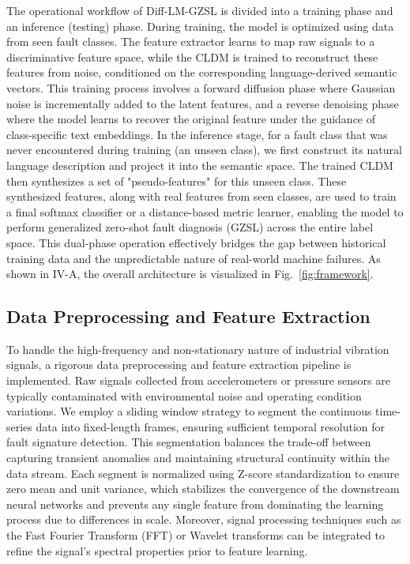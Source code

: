The operational workflow of Diff-LM-GZSL is divided into a training phase and an inference (testing) phase. During training, the model is optimized using data from seen fault classes. The feature extractor learns to map raw signals to a discriminative feature space, while the CLDM is trained to reconstruct these features from noise, conditioned on the corresponding language-derived semantic vectors. This training process involves a forward diffusion phase where Gaussian noise is incrementally added to the latent features, and a reverse denoising phase where the model learns to recover the original feature under the guidance of class-specific text embeddings. In the inference stage, for a fault class that was never encountered during training (an unseen class), we first construct its natural language description and project it into the semantic space. The trained CLDM then synthesizes a set of "pseudo-features" for this unseen class. These synthesized features, along with real features from seen classes, are used to train a final softmax classifier or a distance-based metric learner, enabling the model to perform generalized zero-shot fault diagnosis (GZSL) across the entire label space. This dual-phase operation effectively bridges the gap between historical training data and the unpredictable nature of real-world machine failures. As shown in IV-A, the overall architecture is visualized in Fig.~\ref{fig:framework}.

\subsection{Data Preprocessing and Feature Extraction}
\label{sec:preprocessing}
To handle the high-frequency and non-stationary nature of industrial vibration signals, a rigorous data preprocessing and feature extraction pipeline is implemented. Raw signals collected from accelerometers or pressure sensors are typically contaminated with environmental noise and operating condition variations. We employ a sliding window strategy to segment the continuous time-series data into fixed-length frames, ensuring sufficient temporal resolution for fault signature detection. This segmentation balances the trade-off between capturing transient anomalies and maintaining structural continuity within the data stream. Each segment is normalized using Z-score standardization to ensure zero mean and unit variance, which stabilizes the convergence of the downstream neural networks and prevents any single feature from dominating the learning process due to differences in scale. Moreover, signal processing techniques such as the Fast Fourier Transform (FFT) or Wavelet transforms can be integrated to refine the signal's spectral properties prior to feature learning.

